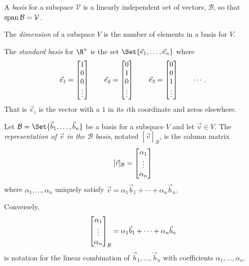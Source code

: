 \begin{SaveDefinition}[key=Basis, title={Basis}]
	A
	\emph{basis} for a subspace $\mathcal V$ is a linearly independent set of vectors,
	$\mathcal B$, so that $\operatorname{span}\mathcal B=\mathcal V$.
\end{SaveDefinition}

\begin{SaveDefinition}[key=Dimension, title={Dimension}]
	The
	\emph{dimension} of a subspace $V$ is the number of elements in a basis
	for $V$.
\end{SaveDefinition}

\begin{SaveDefinition}[key=StandardBasisforRn, title={Standard Basis}]
	The \emph{standard basis} for $\R^n$ is the set $\Set{\vec e_1,\ldots,\vec e_n}$ where
	\[
		\vec e_1=\begin{bmatrix}1\\0\\0\\\vdots\end{bmatrix}\qquad
		\vec e_2=\begin{bmatrix}0\\1\\0\\\vdots\end{bmatrix}\qquad
		\vec e_3=\begin{bmatrix}0\\0\\1\\\vdots\end{bmatrix}\qquad\cdots.
	\]
	That is $\vec e_i$ is the vector with a $1$ in its
	$i$th coordinate and zeros elsewhere.
\end{SaveDefinition}

\begin{SaveDefinition}[
	key=RepresentationinaBasis,
	title={Representation in a Basis}]

	Let $\mathcal B=\Set{\vec b_1,\ldots,\vec b_n}$ be a basis for a
	subspace $V$ and let $\vec v\in V$. The
	\emph{representation of $\vec v$ in the $\mathcal B$ basis}, notated $[\vec
	v]_{\mathcal B}$, is the column matrix
	\[
		[\vec v]_{\mathcal B}= \begin{bmatrix}\alpha_1\\\vdots\\\alpha_n\end{bmatrix}
	\]
	 where $\alpha_{1},\ldots,\alpha_{n}$ uniquely satisfy
	$\vec v=\alpha_{1}\vec b_{1}+\cdots+\alpha_{n}\vec b_{n}.$

	Conversely,
	\[
		\begin{bmatrix}\alpha_1\\\vdots\\\alpha_n\end{bmatrix}_{\mathcal B}= \alpha_{1}\vec b_{1}+\cdots
		+\alpha_{n}\vec b_{n}
	\]
	 is notation for the linear combination of $\vec b_{1},\ldots,\vec b_{n}$
	with coefficients $\alpha_{1},\ldots,\alpha_{n}$.
\end{SaveDefinition}

